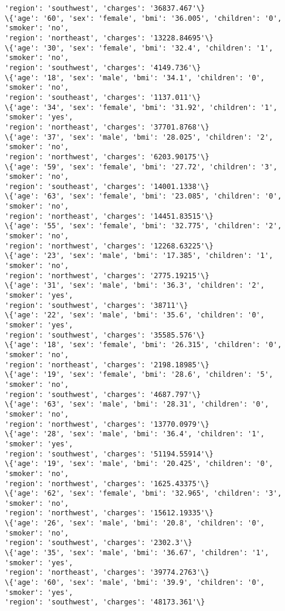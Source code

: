 \documentclass[11pt]{article}
\begin{document}
\begin{Verbatim}[commandchars=\\\{\}]
'region': 'southwest', 'charges': '36837.467'\}
\{'age': '60', 'sex': 'female', 'bmi': '36.005', 'children': '0', 'smoker': 'no',
'region': 'northeast', 'charges': '13228.84695'\}
\{'age': '30', 'sex': 'female', 'bmi': '32.4', 'children': '1', 'smoker': 'no',
'region': 'southwest', 'charges': '4149.736'\}
\{'age': '18', 'sex': 'male', 'bmi': '34.1', 'children': '0', 'smoker': 'no',
'region': 'southeast', 'charges': '1137.011'\}
\{'age': '34', 'sex': 'female', 'bmi': '31.92', 'children': '1', 'smoker': 'yes',
'region': 'northeast', 'charges': '37701.8768'\}
\{'age': '37', 'sex': 'male', 'bmi': '28.025', 'children': '2', 'smoker': 'no',
'region': 'northwest', 'charges': '6203.90175'\}
\{'age': '59', 'sex': 'female', 'bmi': '27.72', 'children': '3', 'smoker': 'no',
'region': 'southeast', 'charges': '14001.1338'\}
\{'age': '63', 'sex': 'female', 'bmi': '23.085', 'children': '0', 'smoker': 'no',
'region': 'northeast', 'charges': '14451.83515'\}
\{'age': '55', 'sex': 'female', 'bmi': '32.775', 'children': '2', 'smoker': 'no',
'region': 'northwest', 'charges': '12268.63225'\}
\{'age': '23', 'sex': 'male', 'bmi': '17.385', 'children': '1', 'smoker': 'no',
'region': 'northwest', 'charges': '2775.19215'\}
\{'age': '31', 'sex': 'male', 'bmi': '36.3', 'children': '2', 'smoker': 'yes',
'region': 'southwest', 'charges': '38711'\}
\{'age': '22', 'sex': 'male', 'bmi': '35.6', 'children': '0', 'smoker': 'yes',
'region': 'southwest', 'charges': '35585.576'\}
\{'age': '18', 'sex': 'female', 'bmi': '26.315', 'children': '0', 'smoker': 'no',
'region': 'northeast', 'charges': '2198.18985'\}
\{'age': '19', 'sex': 'female', 'bmi': '28.6', 'children': '5', 'smoker': 'no',
'region': 'southwest', 'charges': '4687.797'\}
\{'age': '63', 'sex': 'male', 'bmi': '28.31', 'children': '0', 'smoker': 'no',
'region': 'northwest', 'charges': '13770.0979'\}
\{'age': '28', 'sex': 'male', 'bmi': '36.4', 'children': '1', 'smoker': 'yes',
'region': 'southwest', 'charges': '51194.55914'\}
\{'age': '19', 'sex': 'male', 'bmi': '20.425', 'children': '0', 'smoker': 'no',
'region': 'northwest', 'charges': '1625.43375'\}
\{'age': '62', 'sex': 'female', 'bmi': '32.965', 'children': '3', 'smoker': 'no',
'region': 'northwest', 'charges': '15612.19335'\}
\{'age': '26', 'sex': 'male', 'bmi': '20.8', 'children': '0', 'smoker': 'no',
'region': 'southwest', 'charges': '2302.3'\}
\{'age': '35', 'sex': 'male', 'bmi': '36.67', 'children': '1', 'smoker': 'yes',
'region': 'northeast', 'charges': '39774.2763'\}
\{'age': '60', 'sex': 'male', 'bmi': '39.9', 'children': '0', 'smoker': 'yes',
'region': 'southwest', 'charges': '48173.361'\}

\end{Verbatim}
\end{document}
